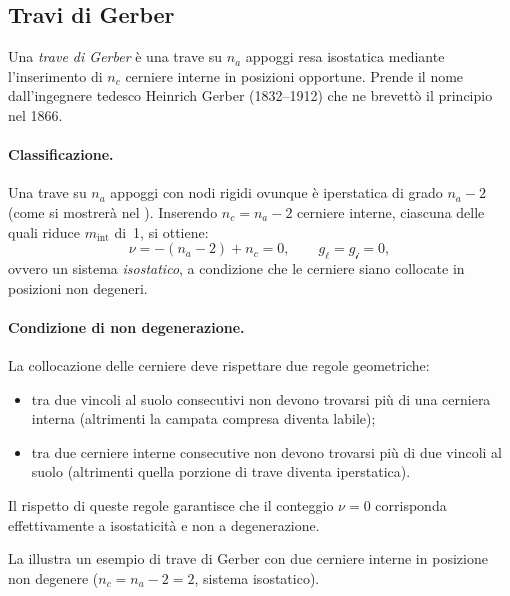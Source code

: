 \subsection{Travi di Gerber}
\label{subsec:gerber}

Una \emph{trave di Gerber} è una trave su $n_a$ appoggi resa
isostatica mediante l'inserimento di $n_c$ cerniere interne in
posizioni opportune. Prende il nome dall'ingegnere tedesco
Heinrich Gerber (1832--1912) che ne brevettò il principio nel 1866.

\paragraph{Classificazione.}

Una trave su $n_a$ appoggi con nodi rigidi ovunque è iperstatica
di grado $n_a - 2$ (come si mostrerà nel ). Inserendo $n_c = n_a - 2$
cerniere interne, ciascuna delle quali riduce $m_{\text{int}}$
di~1, si ottiene:
\begin{equation}\label{eq:class_gerber}
\nu = -(n_a - 2) + n_c = 0, \qquad
g_\ell = g_{\mathscr{i}} = 0,
\end{equation}
ovvero un sistema \emph{isostatico}, a condizione
che le cerniere siano collocate in posizioni non
degeneri.

\paragraph{Condizione di non degenerazione.}
La collocazione delle cerniere deve rispettare due
regole geometriche:
\begin{itemize}[noitemsep]
\item tra due vincoli al suolo consecutivi non
devono trovarsi più di una cerniera interna
(altrimenti la campata compresa diventa labile);
\item tra due cerniere interne consecutive non
devono trovarsi più di due vincoli al suolo
(altrimenti quella porzione di trave diventa
iperstatica).
\end{itemize}
Il rispetto di queste regole garantisce che il
conteggio $\nu = 0$ corrisponda effettivamente
a isostaticità e non a degenerazione.

La  illustra un esempio di trave
di Gerber con due cerniere interne in posizione non
degenere ($n_c = n_a - 2 = 2$, sistema isostatico).


